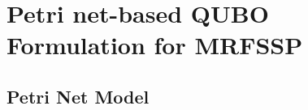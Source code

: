 \documentclass[conference]{IEEEtran}
\begin{document}
%
%
%
%



\section{Petri net-based QUBO Formulation for MRFSSP}

\subsection{Petri Net Model}
\end{document}
